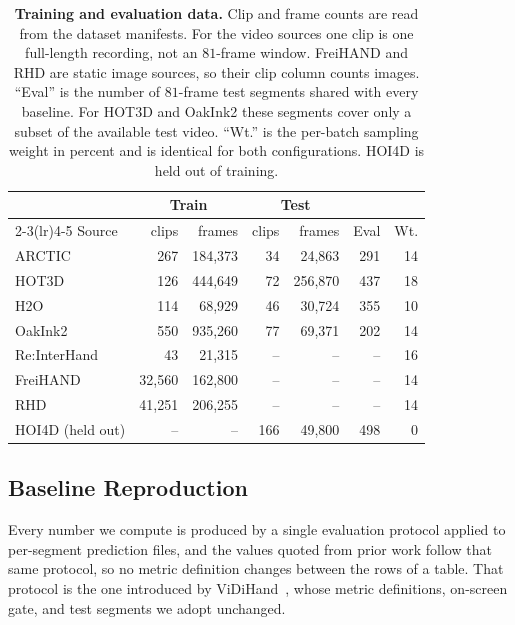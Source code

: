 \documentclass[10pt,twocolumn,letterpaper]{article}
\begin{document}
\begin{table}[!t]
\centering
\small
\setlength{\tabcolsep}{1.6pt}
\renewcommand{\arraystretch}{0.82}
\caption{\textbf{Training and evaluation data.} Clip and frame counts are read from the dataset manifests. For the video sources one clip is one full-length recording, not an $81$-frame window. FreiHAND and RHD are static image sources, so their clip column counts images. ``Eval'' is the number of $81$-frame test segments shared with every baseline. For HOT3D and OakInk2 these segments cover only a subset of the available test video. ``Wt.'' is the per-batch sampling weight in percent and is identical for both configurations. HOI4D is held out of training.}
\label{tab:mix}
\begin{tabular}{@{}l rr rr r r@{}}
\toprule
 & \multicolumn{2}{c}{Train} & \multicolumn{2}{c}{Test} & & \\
\cmidrule(lr){2-3}\cmidrule(lr){4-5}
Source & clips & frames & clips & frames & Eval & Wt. \\
\midrule
ARCTIC & 267 & 184{,}373 & 34 & 24{,}863 & 291 & 14 \\
HOT3D & 126 & 444{,}649 & 72 & 256{,}870 & 437 & 18 \\
H2O & 114 & 68{,}929 & 46 & 30{,}724 & 355 & 10 \\
OakInk2 & 550 & 935{,}260 & 77 & 69{,}371 & 202 & 14 \\
Re:InterHand & 43 & 21{,}315 & -- & -- & -- & 16 \\
FreiHAND & 32{,}560 & 162{,}800 & -- & -- & -- & 14 \\
RHD & 41{,}251 & 206{,}255 & -- & -- & -- & 14 \\
\midrule
HOI4D (held out) & -- & -- & 166 & 49{,}800 & 498 & 0 \\
\bottomrule
\end{tabular}
\end{table}

\subsection{Baseline Reproduction}
Every number we compute is produced by a single evaluation protocol applied to per-segment prediction files, and the values quoted from prior work follow that same protocol, so no metric definition changes between the rows of a table. That protocol is the one introduced by ViDiHand~\citep{vidihand2026}, whose metric definitions, on-screen gate, and test segments we adopt unchanged.
\end{document}

